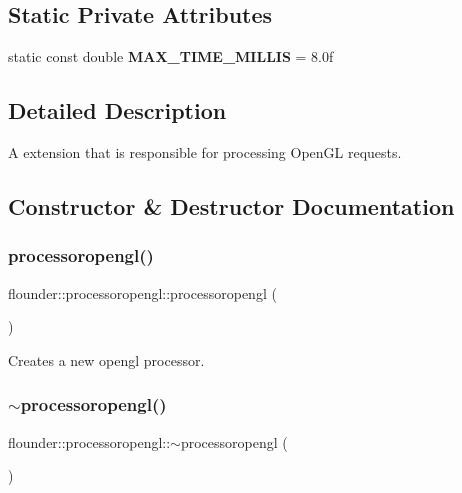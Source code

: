 \subsection*{Static Private Attributes}
\begin{DoxyCompactItemize}
\item 
\mbox{\label{classflounder_1_1processoropengl_a344599e84ea4460a6a43a573ac3a595d}} 
static const double {\bfseries M\+A\+X\+\_\+\+T\+I\+M\+E\+\_\+\+M\+I\+L\+L\+IS} = 8.\+0f
\end{DoxyCompactItemize}


\subsection{Detailed Description}
A extension that is responsible for processing Open\+GL requests. 



\subsection{Constructor \& Destructor Documentation}
\mbox{\label{classflounder_1_1processoropengl_a6cae6b14a140e49a2d8695c2be1816b2}} 
\subsubsection{\texorpdfstring{processoropengl()}{processoropengl()}}
{\footnotesize\ttfamily flounder\+::processoropengl\+::processoropengl (\begin{DoxyParamCaption}{ }\end{DoxyParamCaption})}



Creates a new opengl processor. 

\mbox{\label{classflounder_1_1processoropengl_a6ee7c280950f4579915069d83225eaec}} 
\subsubsection{\texorpdfstring{$\sim$processoropengl()}{~processoropengl()}}
{\footnotesize\ttfamily flounder\+::processoropengl\+::$\sim$processoropengl (\begin{DoxyParamCaption}{ }\end{DoxyParamCaption})}



